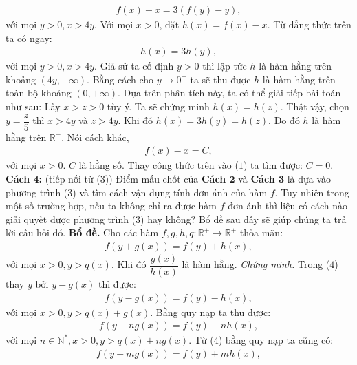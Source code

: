 \begin{multicols}{2}
	\begin{align*}
		f(x) - x = 3(f(y) - y),
	\end{align*}
	với mọi $y > 0,x > 4y.$
	\vskip 0.1cm
	Với mọi $x > 0$, đặt $h(x) = f(x) - x$. Từ đẳng thức trên ta có ngay: 
	\begin{align*}
		h(x) = 3h(y),
	\end{align*}
	với mọi $y > 0,x > 4y.$
	\vskip 0.1cm
	Giả sử ta cố định $y > 0$  thì lập tức $h$ là hàm hằng trên khoảng $(4y, + \infty)$. Bằng cách cho $y \to 0^+$  ta sẽ thu được $h$ là hàm hằng trên toàn bộ khoảng $(0 , + \infty)$. Dựa trên phân tích này, ta có thể giải tiếp bài toán như sau:
	\vskip 0.1cm
	Lấy $x > z > 0$  tùy ý. Ta sẽ chứng minh $h(x) = h(z)$.
	\vskip 0.1cm 
	Thật vậy, chọn $y = \dfrac{z}{5}$  thì $x > 4y$  và  $z > 4y$. Khi đó $h(x) = 3h(y) = h(z)$.  Do đó  $h$ là hàm hằng trên $\mathbb{R^+}$. Nói cách khác, 
	\begin{align*}
		f(x) - x = C,
	\end{align*}
	với mọi $x > 0$. $C$ là hằng số.
	\vskip 0.1cm
	Thay công thức trên vào ($1$) ta tìm được: $C = 0.$
	\vskip 0.1cm
	\textbf{\color{hoccungpi}Cách $\pmb4$:} (tiếp nối từ ($3$))
	\vskip 0.1cm     
	Điểm mấu chốt của \textbf{\color{hoccungpi}Cách $\pmb2$} và \textbf{\color{hoccungpi}Cách $\pmb3$} là dựa vào phương trình ($3$) và tìm cách vận dụng tính đơn ánh của hàm $f$. Tuy nhiên trong một số trường hợp, nếu ta không chỉ ra được hàm $f$  đơn ánh thì liệu có cách nào giải quyết được phương trình ($3$) hay không? Bổ đề sau đây sẽ giúp chúng ta trả lời câu hỏi đó.  
	\vskip 0.1cm
	\textbf{\color{hoccungpi}Bổ đề.}  Cho các hàm  $f,g,h,q: \mathbb{R^+} \to \mathbb{R^+}$ thỏa mãn: 
	\begin{align*}
		f(y + g(x)) = f(y) + h(x), \tag{$4$}
	\end{align*}
	với mọi $x > 0,y > q(x)$.
	Khi đó $\dfrac{g(x)}{h(x)}$  là hàm hằng.
	\vskip 0.1cm
	\textit{Chứng minh.}  Trong ($4$) thay $y$ bởi $y - g(x)$  thì được: 
	\begin{align*}
		f(y - g(x)) = f(y) - h(x),
	\end{align*}
	với mọi $x > 0,y > q(x) + g(x).$
	\vskip 0.1cm
	Bằng quy nạp ta thu được: 
	\begin{align*}
		f(y - ng(x)) = f(y) - nh(x), \tag{$5$}
	\end{align*}
	với mọi $n \in \mathbb{N^*},x > 0,y > q(x) + ng(x)$. 
	\vskip 0.1cm
	Từ ($4$) bằng quy nạp ta cũng có: 
	\begin{align*}
		f(y + mg(x)) = f(y) + mh(x), \tag{$6$}
	\end{align*}

\end{multicols}
